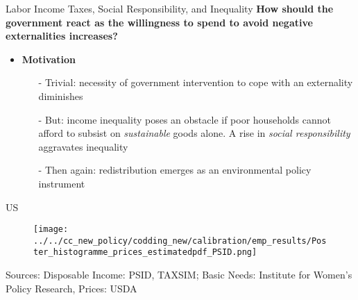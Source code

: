 \begin{frame}{Labor Income Taxes, Social Responsibility, and Inequality}
	\vspace{-26mm}
\footnotesize
	\alert{\textbf{How should the government react as the willingness to spend to avoid negative externalities increases?}}
	\pause
	\begin{itemize}[<+->]
		\item \textbf{Motivation}
		{\footnotesize
		\begin{itemize}			
			\item[-] Trivial: necessity of government intervention to cope with an externality diminishes
			\item[-] But: income inequality poses an obstacle if poor households cannot afford to subsist on \textit{sustainable} goods alone. A rise in \textit{social responsibility} aggravates inequality
			\item[-] Then again: redistribution emerges as an environmental policy instrument
		\end{itemize}}
	\end{itemize}
\end{frame}

\begin{frame}{US}
\vspace{-2mm}
\begin{minipage}[]{1\textwidth}
	\begin{figure}
		\texttt{[image: ../../cc\_new\_policy/codding\_new/calibration/emp\_results/Poster\_histogramme\_prices\_estimatedpdf\_PSID.png]}	
	\end{figure}
	\centering
	\tiny{Sources: Disposable Income: PSID, TAXSIM; Basic Needs: Institute for Women's Policy Research, Prices: USDA}
\end{minipage}\end{frame}


